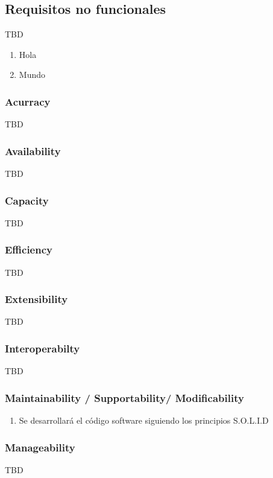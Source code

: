     \subsection{Requisitos no funcionales}
        TBD

        \begin{enumerate}[label=\textbf{\texttt{RNF-\arabic*}}]
            \item Hola
            \item Mundo
        \end{enumerate}

        \subsubsection{Acurracy}
            TBD
        \subsubsection{Availability}
            TBD
        \subsubsection{Capacity}
            TBD
        \subsubsection{Efficiency}
            TBD
        \subsubsection{Extensibility}
            TBD
        \subsubsection{Interoperabilty}
            TBD
        \subsubsection{Maintainability / Supportability/ Modificability}
            \begin{enumerate}[label=\textbf{\texttt{RX-\arabic*}}]
                \item Se desarrollará el código software siguiendo los principios S.O.L.I.D
            \end{enumerate}

        \subsubsection{Manageability}
            TBD
